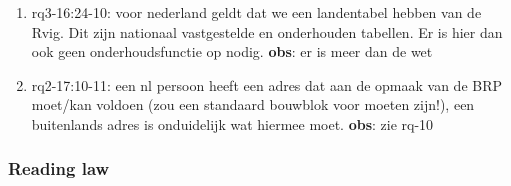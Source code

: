 \begin{enumerate}
    \item rq3-16:24-10: voor nederland geldt dat we een landentabel hebben van de Rvig. Dit zijn nationaal vastgestelde en onderhouden tabellen. Er is hier dan ook geen onderhoudsfunctie op nodig.
     \newline\textbf{obs}: er is meer dan de wet
     
    \item rq2-17:10-11: een nl persoon heeft een adres dat aan de opmaak van de BRP moet/kan voldoen (zou een standaard bouwblok voor moeten zijn!), een buitenlands adres is onduidelijk wat hiermee moet.    
     \newline\textbf{obs}: zie rq-10
\end{enumerate}

\subsubsection{Reading law}
\begin{comment}
Hoort dit niet bij rq3?
plaats hier de afgehandelde items.
\end{comment}
